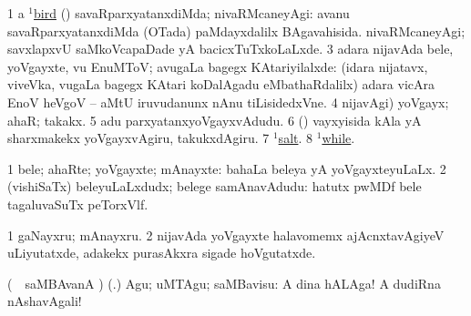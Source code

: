 \bentry
{}
\gl{\gu}
\enum
\emng

\noindent
\gl{\pagu}
\expl{}
\bmng
\bnum
\num{1} a \hyperref{kandict_b.pdf}{B}{bird(1) nuga(1)}{$^1$bird}  
  (\AmA) 
\banum
{} savaRparxyatanxdiMda; nivaRMcaneyAgi:  avanu savaRparxyatanxdiMda (OTada) paMdayxdalilx BAgavahisida. 
 nivaRMcaneyAgi; savxlapxvU saMkoVcapaDade yA bacicxTuTxkoLaLxde. 
\eanum
\numie
\num{3}  adara nijavAda bele, yoVgayxte, \mo vu EnuMToV; avugaLa bagegx KAtariyilalxde:  (idara nijatavx, viveVka, \mo vugaLa bagegx KAtari koDalAgadu eMbathaRdalilx) adara vicAra EnoV heVgoV -- aMtU iruvudanunx nAnu tiLisidedxVne. 
\num{4}  nijavAgi) yoVgayx; ahaR; takakx. 
\num{5}  adu parxyatanxyoVgayxvAdudu. 
\num{6}  (\AmA) vayxyisida kAla yA sharxmakekx yoVgayxvAgiru, takukxdAgiru. 
\num{7}  \hyperref{kandict_s.pdf}{S}{salt(1) pagu(20)}{$^1$salt}. 
\num{8}  \hyperlink{while(1) pagu(9)}{$^1$while}. 
\enum
\emng
\eentry

\bentry
{}
\gl{\nA}
\expl{}
\bmng
\bnum
\num{1} bele; ahaRte; yoVgayxte; mAnayxte:  bahaLa beleya yA yoVgayxteyuLaLx. 
\num{2} (vishiSaTx) beleyuLaLxdudx; belege samAnavAdudu:  hatutx pwMDf bele tagaluvaSuTx peTorxVlf. 
\enum
\emng

\noindent
\gl{\pagu}
\expl{}
\bmng
\bnum
\num{1}  gaNayxru; mAnayxru. 
\num{2}  nijavAda yoVgayxte halavomemx ajAcnxtavAgiyeV uLiyutatxde, adakekx purasAkxra sigade hoVgutatxde. 
\enum
\emng
\eentry

\bentry
{}
\gl{\sakirx}
\expl{}
\bmng
(\parxpu\ \Eva\ saMBAvanA \rUpa) (\pArxparx.) Agu; uMTAgu; saMBavisu:  A dina hALAga! A dudiRna nAshavAgali! \mo 
\emng
\eentry

